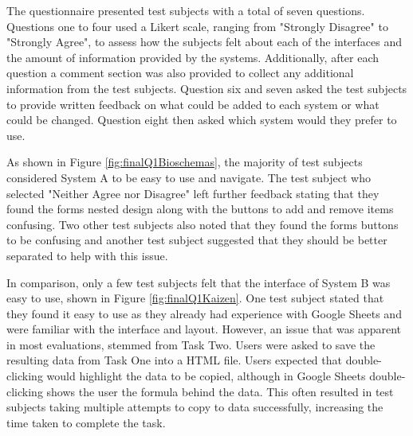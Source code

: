 The questionnaire presented test subjects with a total of seven questions. Questions one to four used a Likert scale, ranging from "Strongly Disagree" to "Strongly Agree", to assess how the subjects felt about each of the interfaces and the amount of information provided by the systems. Additionally, after each question a comment section was also provided to collect any additional information from the test subjects. Question six and seven asked the test subjects to provide written feedback on what could be added to each system or what could be changed. Question eight then asked which system would they prefer to use.

As shown in Figure \ref{fig:finalQ1Bioschemas}, the majority of test subjects considered System A to be easy to use and navigate. The test subject who selected "Neither Agree nor Disagree" left further feedback stating that they found the forms nested design along with the buttons to add and remove items confusing. Two other test subjects also noted that they found the forms buttons to be confusing and another test subject suggested that they should be better separated to help with this issue.

In comparison, only a few test subjects felt that the interface of System B was easy to use, shown in Figure \ref{fig:finalQ1Kaizen}. One test subject stated that they found it easy to use as they already had experience with Google Sheets and were familiar with the interface and layout. However, an issue that was apparent in most evaluations, stemmed from Task Two. Users were asked to save the resulting data from Task One into a HTML file. Users expected that double-clicking would highlight the data to be copied, although in Google Sheets double-clicking shows the user the formula behind the data. This often resulted in test subjects taking multiple attempts to copy to data successfully, increasing the time taken to complete the task. \newline

